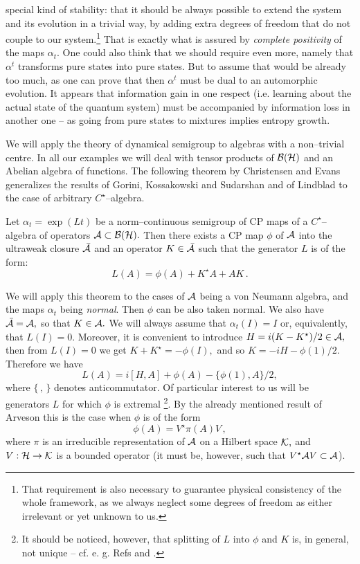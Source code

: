 \documentclass[12pt]{article}
\def\be{\begin{equation}} \def\ee{\end{equation}}
\begin{document}
special kind of stability:  
that it should be always possible to extend the
system and its evolution in a trivial way,  by adding extra degrees of
freedom that do not couple to our system.\footnote{That requirement 
is also necessary to guarantee physical consistency of the whole
framework, as we always neglect some degrees of freedom as either
irrelevant or yet unknown to us.}  
That is exactly what is assured by 
{\sl complete positivity} of the maps $\alpha_t. $ One could also think that
we should require even more,  namely that $\alpha ^t$ transforms pure states 
into
pure states.  But to assume that would be already too much,
as one can prove that then
$\alpha^t $ must be dual to an automorphic evolution.  
It appears that information 
gain in one respect  (i.e. learning about the actual 
state of the quantum system) 
must be accompanied by information loss in another one -- as
going from pure states to mixtures implies entropy growth. 

We will apply the theory of dynamical semigroup to algebras with a non--trivial
centre.  In all our examples we will deal with tensor products of 
${\cal B} ({\cal H})$ and an Abelian algebra of functions.  
The following theorem by Christensen and Evans \cite{chr} generalizes the
results of Gorini,  Kossakowski and Sudarshan and of Lindblad to the case of
arbitrary $C^{\star }$--algebra. 

\begin{theorem}
Let $\alpha_t = \exp  (L t)$ be a
norm--continuous semigroup of CP maps of a
$C^{\star }$-- algebra of operators ${\cal A}\subset {\cal B} ({\cal
H}) . $ Then there exists a CP map $\phi$
of ${\cal A}$ into the ultraweak closure ${\bar {\cal A}}$
and an operator $K\in {\bar {\cal A}}$ such that the
generator $L$ is of the form: 
\be
L (A) = \phi  (A) + K^{\star }A + AK \,  . 
\ee
\end{theorem}
We will apply this theorem to the cases of ${\cal A}$ being a von Neumann
algebra,  and the maps $\alpha_t$ being {\sl normal}.  Then $\phi$ can be
also taken normal.  We also have ${\bar {{\cal A}}} = {\cal A} , $
so that $K\in {\cal A} . $ We will always assume that $\alpha_t  (I) = I $ or, 
equivalently,  that $L (I)=0 . $  Moreover,  it is convenient to introduce $
H=i (K-K^{\star })/2 \in {\cal A}, $ then from $L (I)=0$ we get $K+K^{\star
}=-\phi  (I) , $ and so $K=-iH-\phi  (1)/2 . $ Therefore we have \be
L (A) = i\left[H, A\right]+\phi  (A) -\{ \phi  (1) , A\}/2 ,  \ee         
where $\{\,  ,  \,  \}$ denotes anticommutator.  Of particular interest to us
will be generators $L$ for which $\phi$ is extremal \footnote{It should 
be noticed, 
however,  that splitting of $L$ into $\phi$ and $K$ is,  in general,  not
unique -- cf.  e. g.  Refs \cite{dav} and \cite[Ch. III. 29--30]{par}. }.  
By the already
mentioned result of Arveson \cite{arv} this is the case when $\phi$ is
of the form \be
\phi  (A)=V^{\star }\pi  (A) V \,  ,  \ee   
where $\pi$ is an irreducible representation of ${\cal A}$ on a Hilbert
space ${\cal K} , $ and $V: {\cal H}\rightarrow {\cal K}$ is a bounded
operator  (it must be,  however,  such that $V^{\star}{\cal A} V \subset 
{\cal A
}$).  
\end{document}
